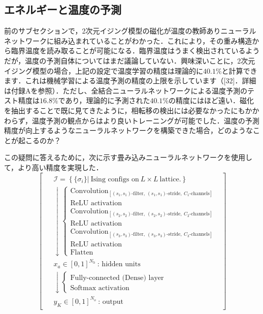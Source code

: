 \documentclass[a4paper,11pt]{jsarticle}
\begin{document}
\subsection{エネルギーと温度の予測}
前のサブセクションで，2次元イジング模型の磁化が温度の教師ありニューラルネットワークに組み込まれていることがわかった．これにより，その重み構造から臨界温度を読み取ることが可能になる．臨界温度はうまく検出されているようだが，温度の予測自体についてはまだ議論していない．興味深いことに，2次元イジング模型の場合，上記の設定で温度学習の精度は理論的に$40.1\%$と計算できます．これは機械学習による温度予測の精度の上限を示しています（[32]．詳細は付録Aを参照）．ただし、全結合ニューラルネットワークによる温度予測のテスト精度は$16.8\%$であり，理論的に予測された$40.1\%$の精度にはほど遠い．磁化を抽出することで既に見てきたように，相転移の検出には必要なかったにもかかわらず，温度予測の観点からはより良いトレーニングが可能でした．温度の予測精度が向上するようなニューラルネットワークを構築できた場合，どのようなことが起こるのか？\par
この疑問に答えるために，次に示す畳み込みニューラルネットワークを使用して，より高い精度を実現した．
\begin{equation}
  \begin{bmatrix}
    \begin{aligned}
       & \mathcal{I} = \left\{ \{ \sigma_i \} \Big| \ \text{Ising configs on} \ L \times L \ \text{lattice.} \right\}        \\
       & \downarrow
      \begin{cases}
        \text{Convolution}_{[(s_1,s_1)\text{-filter}, \ (s_1,s_1)\text{-stride}, \ C_1\text{-channels}]} \\
        \text{ReLU activation}                                                                           \\
        \text{Convolution}_{[(s_2,s_2)\text{-filter}, \ (s_2,s_2)\text{-stride}, \ C_2\text{-channels}]} \\
        \text{ReLU activation}                                                                           \\
        \text{Convolution}_{[(s_3,s_3)\text{-filter}, \ (s_3,s_3)\text{-stride}, \ C_3\text{-channels}]} \\
        \text{ReLU activation}                                                                           \\
        \text{Flatten}
      \end{cases} \\
       & x_a \in [0,1]^{N_h} \ \text{: hidden units}                                                                         \\
       & \downarrow
      \begin{cases}
        \text{Fully-connected (Dense) layer} \\
        \text{Softmax activation}
      \end{cases}                                                                                   \\
       & y_K \in [0,1]^{N_o} \ \text{: output}
    \end{aligned}
  \end{bmatrix}
\end{equation}
\end{document}
